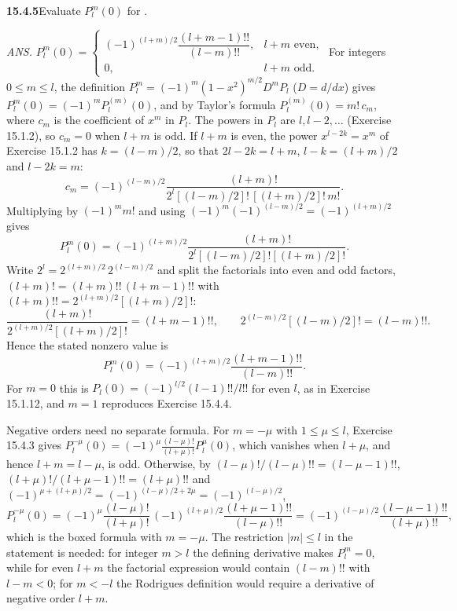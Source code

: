 \par\bigskip
\noindent\textbf{15.4.5}\quad Evaluate $P_{l}^{m}(0)$ for .
\par\nobreak\hfill\emph{ANS.}\enspace
$P_{l}^{m}(0)=\begin{cases}
(-1)^{(l+m)/2}\dfrac{(l+m-1)!!}{(l-m)!!}, & l+m\text{ even},\\[10pt]
0, & l+m\text{ odd}.
\end{cases}$
\solution
For integers $0\le m\le l$, the definition
$P_l^m=(-1)^m(1-x^2)^{m/2}D^mP_l$ ($D=d/dx$) gives
$P_l^m(0)=(-1)^mP_l^{(m)}(0)$, and by Taylor's formula
$P_l^{(m)}(0)=m!\,c_m$, where $c_m$ is the coefficient of $x^m$ in $P_l$.
The powers in $P_l$ are $l,l-2,\ldots$ (Exercise 15.1.2), so $c_m=0$
when $l+m$ is odd.
If $l+m$ is even, the power $x^{l-2k}=x^m$ of Exercise 15.1.2 has
$k=(l-m)/2$, so that $2l-2k=l+m$, $l-k=(l+m)/2$ and $l-2k=m$:
\[
c_m=(-1)^{(l-m)/2}\frac{(l+m)!}{2^l[(l-m)/2]!\,[(l+m)/2]!\,m!}.
\]
Multiplying by $(-1)^mm!$ and using
$(-1)^m(-1)^{(l-m)/2}=(-1)^{(l+m)/2}$ gives
\[
P_l^m(0)=
(-1)^{(l+m)/2}
\frac{(l+m)!}{2^l[(l-m)/2]![(l+m)/2]!}.
\]
Write $2^l=2^{(l+m)/2}\,2^{(l-m)/2}$ and split the factorials into even
and odd factors, $(l+m)!=(l+m)!!\,(l+m-1)!!$ with
$(l+m)!!=2^{(l+m)/2}[(l+m)/2]!$:
\[
\frac{(l+m)!}{2^{(l+m)/2}[(l+m)/2]!}=(l+m-1)!!,\qquad
2^{(l-m)/2}[(l-m)/2]!=(l-m)!!.
\]
Hence the stated nonzero value is
\[
\boxed{P_l^m(0)=(-1)^{(l+m)/2}\frac{(l+m-1)!!}{(l-m)!!}}.
\]
For $m=0$ this is $P_l(0)=(-1)^{l/2}(l-1)!!/l!!$ for even $l$, as in
Exercise 15.1.12, and $m=1$ reproduces Exercise 15.4.4.

Negative orders need no separate formula. For $m=-\mu$ with
$1\le\mu\le l$, Exercise 15.4.3 gives
$P_l^{-\mu}(0)=(-1)^\mu\frac{(l-\mu)!}{(l+\mu)!}P_l^\mu(0)$, which
vanishes when $l+\mu$, and hence $l+m=l-\mu$, is odd. Otherwise, by
$(l-\mu)!/(l-\mu)!!=(l-\mu-1)!!$, $(l+\mu)!/(l+\mu-1)!!=(l+\mu)!!$ and
$(-1)^{\mu+(l+\mu)/2}=(-1)^{(l-\mu)/2+2\mu}=(-1)^{(l-\mu)/2}$,
\[
P_l^{-\mu}(0)=(-1)^\mu\frac{(l-\mu)!}{(l+\mu)!}\,
(-1)^{(l+\mu)/2}\frac{(l+\mu-1)!!}{(l-\mu)!!}
=(-1)^{(l-\mu)/2}\frac{(l-\mu-1)!!}{(l+\mu)!!},
\]
which is the boxed formula with $m=-\mu$.
The restriction $|m|\le l$ in the statement is needed: for integer
$m>l$ the defining derivative makes $P_l^m=0$, while for even $l+m$ the
factorial expression would contain $(l-m)!!$ with $l-m<0$; for $m<-l$
the Rodrigues definition would require a derivative of negative order
$l+m$.

